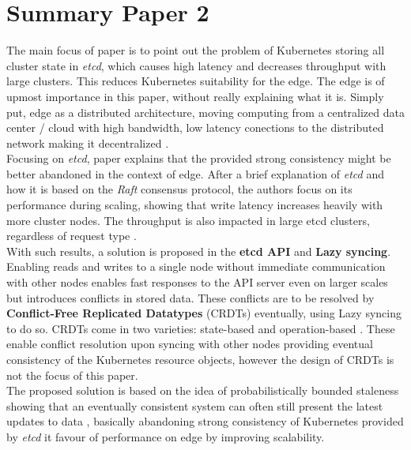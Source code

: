 \section{Summary Paper 2}%
\label{sec:Summary Paper 2}
The main focus of paper \cite{C2} is to point out the problem of Kubernetes storing all cluster state in \textit{etcd}, which causes high latency and decreases throughput with large clusters. This reduces Kubernetes suitability for the edge. The edge is of upmost importance in this paper, without really explaining what it is. Simply put, edge as a distributed architecture, moving computing from a centralized data center / cloud with high bandwidth, low latency conections to the distributed network making it decentralized \cite{DBigelow_2021}.\\ Focusing on \textit{etcd}, paper \cite{C2} explains that the provided strong consistency might be better abandoned in the context of edge. After a brief explanation of \textit{etcd} and how it is based on the \textit{Raft} consensus protocol, the authors focus on its performance during scaling, showing that write latency increases heavily with more cluster nodes. The throughput is also impacted in large etcd clusters, regardless of request type \cite{C2}. \\
With such results, a solution is proposed in the \textbf{etcd API} and \textbf{Lazy syncing}. Enabling reads and writes to a single node without immediate communication with other nodes enables fast responses to the API server even on larger scales but introduces conflicts in stored data. These conflicts are to be resolved by \textbf{Conflict-Free Replicated Datatypes} (CRDTs) eventually, using Lazy syncing to do so. CRDTs come in two varieties: state-based and operation-based \cite{C2}. These enable conflict resolution upon syncing with other nodes providing eventual consistency of the Kubernetes resource objects, however the design of CRDTs is not the focus of this paper.\\
The proposed solution is based on the idea of probabilistically bounded staleness showing that an eventually consistent system can often still present the latest updates to data \cite{C2}, basically abandoning strong consistency of Kubernetes provided by \textit{etcd} it favour of performance on edge by improving scalability.